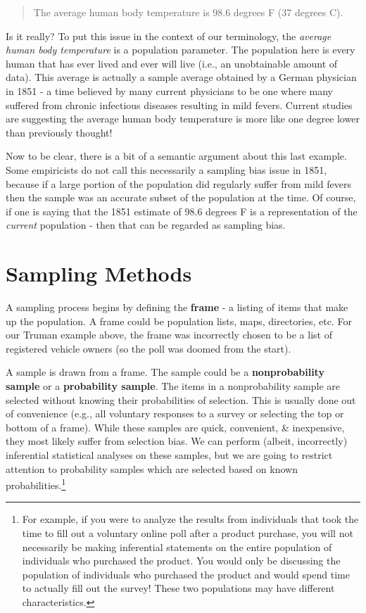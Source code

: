 \documentclass[
]{book}
\begin{document}
\begin{quote}
The average human body temperature is 98.6 degrees F (37 degrees C).
\end{quote}

Is it really? To put this issue in the context of our terminology, the \emph{average human body temperature} is a population parameter. The population here is every human that has ever lived and ever will live (i.e., an unobtainable amount of data). This average is actually a sample average obtained by a German physician in 1851 - a time believed by many current physicians to be one where many suffered from chronic infectious diseases resulting in mild fevers. Current studies are suggesting the average human body temperature is more like one degree lower than previously thought!

Now to be clear, there is a bit of a semantic argument about this last example. Some empiricists do not call this necessarily a sampling bias issue in 1851, because if a large portion of the population did regularly suffer from mild fevers then the sample was an accurate subset of the population at the time. Of course, if one is saying that the 1851 estimate of 98.6 degrees F is a representation of the \emph{current} population - then that can be regarded as sampling bias.

\section{Sampling Methods}\label{sampling-methods}

A sampling process begins by defining the \textbf{frame} - a listing of items that make up the population. A frame could be population lists, maps, directories, etc. For our Truman example above, the frame was incorrectly chosen to be a list of registered vehicle owners (so the poll was doomed from the start).

A sample is drawn from a frame. The sample could be a \textbf{nonprobability sample} or a \textbf{probability sample}. The items in a nonprobability sample are selected without knowing their probabilities of selection. This is usually done out of convenience (e.g., all voluntary responses to a survey or selecting the top or bottom of a frame). While these samples are quick, convenient, \& inexpensive, they most likely suffer from selection bias. We can perform (albeit, incorrectly) inferential statistical analyses on these samples, but we are going to restrict attention to probability samples which are selected based on known probabilities.\footnote{For example, if you were to analyze the results from individuals that took the time to fill out a voluntary online poll after a product purchase, you will not necessarily be making inferential statements on the entire population of individuals who purchased the product. You would only be discussing the population of individuals who purchased the product and would spend time to actually fill out the survey! These two populations may have different characteristics.}
\end{document}
